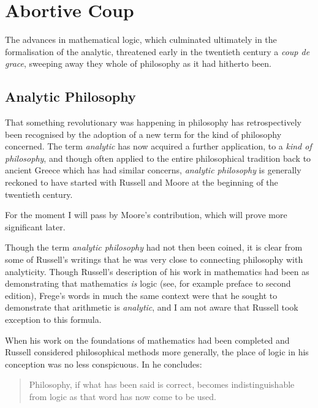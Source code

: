\chapter{Abortive Coup}\label{AbortiveCoup}

The advances in mathematical logic, which culminated ultimately in the formalisation of the analytic, threatened early in the twentieth century a {\it coup de grace}, sweeping away they whole of philosophy as it had hitherto been.

\section{Analytic Philosophy}

That something revolutionary was happening in philosophy has retrospectively been recognised by the adoption of a new term for the kind of philosophy concerned.
The term {\it analytic} has now acquired a further application, to a {\it kind of philosophy}, and though often applied to the entire philosophical tradition back to ancient Greece which has had similar concerns, {\it analytic philosophy} is generally reckoned to have started with Russell and Moore at the beginning of the twentieth century.

For the moment I will pass by Moore's contribution, which will prove more significant later.

Though the term {\it analytic philosophy} had not then been coined, it is clear from some of Russell's writings that he was very close to connecting philosophy with analyticity.
Though Russell's description of his work in mathematics had been as demonstrating that mathematics {\it is} logic (see, for example \cite{russellPRM} preface to second edition), Frege's words in much the same context were that he sought to demonstrate that arithmetic is {\it analytic}, and I am not aware that Russell took exception to this formula.

When his work on the foundations of mathematics had been completed and Russell considered philosophical methods more generally, the place of logic in his conception was no less conspicuous.
In \cite{russellSMP} he concludes:

\begin{quotation}
Philosophy, if what has been said is correct, becomes indistinguishable from logic as that word has now come to be used. 
\end{quotation}

